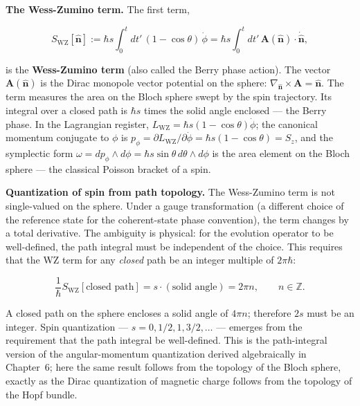 \medskip\noindent\textbf{The Wess-Zumino term.} The first term,
\begin{linenomath}
\begin{equation}
S_{\mathrm{WZ}}[\hat{\bm n}] := \hbar s\int_{0}^{t} dt'\,(1 - \cos\theta)\,\dot{\phi}
= \hbar s\int_{0}^{t} dt'\,\bm A(\hat{\bm n})\!\cdot\!\dot{\hat{\bm n}},
\label{eq:wz-term}
\end{equation}
\end{linenomath}
is the \textbf{Wess-Zumino term} (also called the Berry phase action). The vector $\bm A(\hat{\bm n})$ is the Dirac monopole vector potential on the sphere: $\nabla_{\hat{\bm n}} \times \bm A = \hat{\bm n}$. The term measures the area on the Bloch sphere swept by the spin trajectory. Its integral over a closed path is $\hbar s$ times the solid angle enclosed --- the Berry phase. In the Lagrangian register, $L_{\mathrm{WZ}} = \hbar s(1-\cos\theta)\dot{\phi}$; the canonical momentum conjugate to $\phi$ is $p_{\phi} = \partial L_{\mathrm{WZ}}/\partial\dot{\phi} = \hbar s(1-\cos\theta) = S_{z}$, and the symplectic form $\omega = dp_{\phi}\wedge d\phi = \hbar s\sin\theta\,d\theta\wedge d\phi$ is the area element on the Bloch sphere --- the classical Poisson bracket of a spin.

\medskip\noindent\textbf{Quantization of spin from path topology.} The Wess-Zumino term is not single-valued on the sphere. Under a gauge transformation (a different choice of the reference state for the coherent-state phase convention), the term changes by a total derivative. The ambiguity is physical: for the evolution operator to be well-defined, the path integral must be independent of the choice. This requires that the WZ term for any \emph{closed} path be an integer multiple of $2\pi\hbar$:
\begin{linenomath}
\begin{equation}
\frac{1}{\hbar}S_{\mathrm{WZ}}[\text{closed path}] = s\cdot(\text{solid angle}) = 2\pi n,
\qquad n \in \mathbb{Z}.
\label{eq:spin-quantization}
\end{equation}
\end{linenomath}
A closed path on the sphere encloses a solid angle of $4\pi n$; therefore $2s$ must be an integer. Spin quantization --- $s = 0, 1/2, 1, 3/2, \ldots$ --- emerges from the requirement that the path integral be well-defined. This is the path-integral version of the angular-momentum quantization derived algebraically in Chapter~6; here the same result follows from the topology of the Bloch sphere, exactly as the Dirac quantization of magnetic charge follows from the topology of the Hopf bundle.


